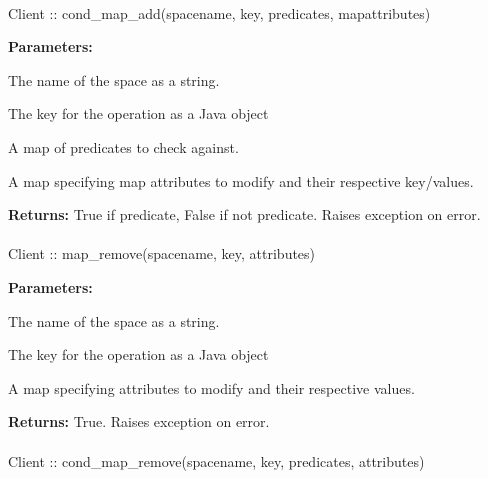 \paragraph{}
\label{api:java:cond_map_add}
\begin{javacode}
Client :: cond_map_add(spacename, key, predicates, mapattributes)
\end{javacode}
\funcdesc 

\noindent\textbf{Parameters:}
\begin{description}[labelindent=\widthof{{\code{mapattributes}}},leftmargin=*,noitemsep,nolistsep,align=right]
\item[\code{spacename}] The name of the space as a string.
\item[\code{key}] The key for the operation as a Java object
\item[\code{predicates}] A map of predicates to check against.
\item[\code{mapattributes}] A map specifying map attributes to modify and their respective key/values.
\end{description}

\noindent\textbf{Returns:}
True if predicate, False if not predicate.  Raises exception on error.

\paragraph{}
\label{api:java:map_remove}
\begin{javacode}
Client :: map_remove(spacename, key, attributes)
\end{javacode}
\funcdesc 

\noindent\textbf{Parameters:}
\begin{description}[labelindent=\widthof{{\code{attributes}}},leftmargin=*,noitemsep,nolistsep,align=right]
\item[\code{spacename}] The name of the space as a string.
\item[\code{key}] The key for the operation as a Java object
\item[\code{attributes}] A map specifying attributes to modify and their respective values.
\end{description}

\noindent\textbf{Returns:}
True.  Raises exception on error.

\paragraph{}
\label{api:java:cond_map_remove}
\begin{javacode}
Client :: cond_map_remove(spacename, key, predicates, attributes)
\end{javacode}
\funcdesc 

